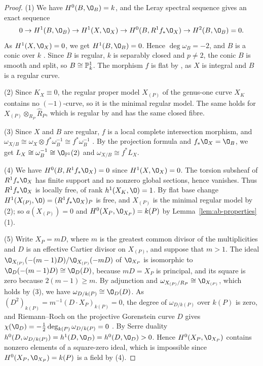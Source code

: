 \begin{proof}
(1) We have $H^0(B,\O_B) = k$, and the Leray spectral sequence gives an exact sequence
\begin{equation}\label{eq:E55O}
  0\to H^1(B,\O_B)\to H^1(X,\O_X)\to H^0(B,R^1f_*\O_X)\to H^2(B,\O_B) = 0.
\end{equation}
As $H^1(X,\O_X) = 0$, we get $H^1(B,\O_B) = 0$.
Hence $\deg\omega_B = -2$, and $B$ is a conic over $k$ \cite[Lemma~10.6(3)]{Kol13}.
Since $B$ is regular, $k$ is separably closed and $p\neq 2$, the conic $B$ is smooth and split, so $B\cong\mathbb{P}^1_k$.
The morphism $f$ is flat by \cite[III, Proposition~9.7]{Har77}, as $X$ is integral and $B$ is a regular curve.

(2) Since $K_X\equiv 0$, the regular proper model $X_{(P)}$ of the genus-one curve $X_K$ contains no $(-1)$-curve, so it is the minimal regular model.
The same holds for $X_{(P)}\otimes_{R_P}\widehat R_P$, which is regular by \cite[Tag~]{Stacks} and has the same closed fibre.

(3) Since $X$ and $B$ are regular, $f$ is a local complete intersection morphism, and $\omega_{X/B}\cong\omega_X\otimes f^*\omega_B^{-1}\cong f^*\omega_B^{-1}$ \cite[Theorem~6.4.9]{Liu02}.
By the projection formula and $f_*\O_X = \O_B$, we get $L_X\cong\omega_B^{-1}\cong\O_{\PP^1}(2)$ and $\omega_{X/B}\cong f^*L_X$.

(4) We have $H^0(B,R^1f_*\O_X) = 0$ since $H^1(X,\O_X) = 0$.
The torsion subsheaf of $R^1f_*\O_X$ has finite support and no nonzero global sections, hence vanishes.
Thus $R^1f_*\O_X$ is locally free, of rank $h^1(X_K,\O) = 1$.
By flat base change $H^1(X_{(P)},\O) = (R^1f_*\O_X)_P$ is free, and $X_{(P)}$ is the minimal regular model by \textup{(2)}; so $a(X_{(P)}) = 0$ and $H^0(X_P,\O_{X_P}) = k(P)$ by Lemma~\ref{lem:ab-properties}\,(1).

(5) Write $X_P = mD$, where $m$ is the greatest common divisor of the multiplicities and $D$ is an effective Cartier divisor on $X_{(P)}$, and suppose that $m>1$.
The ideal $\O_{X_{(P)}}(-(m-1)D)/\O_{X_{(P)}}(-mD)$ of $\O_{X_P}$ is isomorphic to $\O_D(-(m-1)D)\cong\O_D(D)$, because $mD = X_P$ is principal, and its square is zero because $2(m-1)\geq m$.
By adjunction \cite[Theorem~9.1.37]{Liu02} and $\omega_{X_{(P)}/R_P}\cong\O_{X_{(P)}}$, which holds by \textup{(3)}, we have $\omega_{D/k(P)}\cong\O_D(D)$.
As $(D^2)_{k(P)} = m^{-1}(D\cdot X_P)_{k(P)} = 0$, the degree of $\omega_{D/k(P)}$ over $k(P)$ is zero, and Riemann--Roch on the projective Gorenstein curve $D$ gives $\chi(\O_D) = -\tfrac12\deg_{k(P)}\omega_{D/k(P)} = 0$ \cite[Theorem~7.3.17 and Corollary~7.3.31]{Liu02}.
By Serre duality $h^0(D,\omega_{D/k(P)}) = h^1(D,\O_D) = h^0(D,\O_D)>0$.
Hence $H^0(X_P,\O_{X_P})$ contains nonzero elements of a square-zero ideal, which is impossible since $H^0(X_P,\O_{X_P}) = k(P)$ is a field by \textup{(4)}.
\end{proof}

